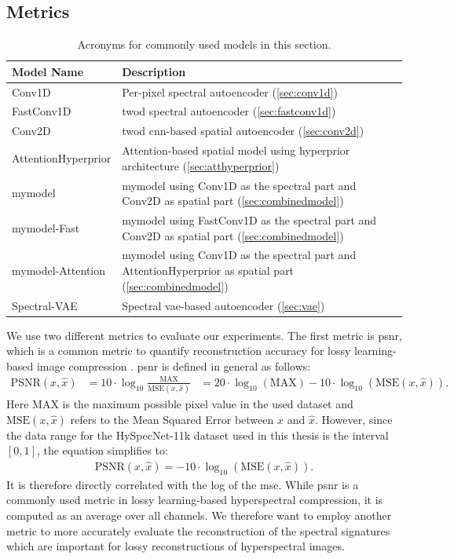 \subsection{Metrics}
\begin{table}
\centering
\caption[Acronyms for Commonly Used Models]{Acronyms for commonly used models in this section.}
\begin{tabularx}{\textwidth}{|L|L|}
\hline
Model Name & Description \\
\hline\hline
Conv1D & Per-pixel spectral autoencoder (\autoref{sec:conv1d})\\
\hline
FastConv1D & \Ac{twod} spectral autoencoder (\autoref{sec:fastconv1d})\\
\hline
Conv2D & \Ac{twod} \ac{cnn}-based spatial autoencoder (\autoref{sec:conv2d})\\
\hline
AttentionHyperprior & Attention-based spatial model using hyperprior architecture (\autoref{sec:atthyperprior}) \\
\hline
\ac{mymodel} & \ac{mymodel} using Conv1D as the spectral part and Conv2D as spatial part (\autoref{sec:combinedmodel}) \\
\hline
\ac{mymodel}-Fast & \ac{mymodel} using FastConv1D as the spectral part and Conv2D as spatial part (\autoref{sec:combinedmodel}) \\
\hline
\ac{mymodel}-Attention & \ac{mymodel} using Conv1D as the spectral part and AttentionHyperprior as spatial part (\autoref{sec:combinedmodel}) \\
\hline
Spectral-VAE & Spectral \ac{vae}-based autoencoder (\autoref{sec:vae}) \\
\hline
\end{tabularx}
\label{fig:shortnames}
\end{table}
We use two different metrics to evaluate our experiments. The first metric is \ac{psnr}, which is a common metric to quantify reconstruction accuracy for lossy learning-based image compression \citep{balle_end--end_2017,balle_variational_2018,minnen_joint_2018,kuester_1d-convolutional_2021,kuester_transferability_2022,la_grassa_hyperspectral_2022}. \Ac{psnr}  is defined in general as follows:
\begin{align}
\text{PSNR}(x,\hat{x}) &= 10\cdot \log_{10}\frac{\text{MAX}}{\text{MSE}(x,\hat{x})}
&= 20 \cdot \log_{10}(\text{MAX}) - 10\cdot \log_{10}(\text{MSE}(x,\hat{x})).
\end{align}
Here MAX is the maximum possible pixel value in the used dataset and $\text{MSE}(x,\hat{x})$ refers to the Mean Squared Error between $x$ and $\hat{x}$. However, since the data range for the HySpecNet-11k dataset used in this thesis is the interval $[0,1]$, the equation simplifies to:
\begin{align}
\text{PSNR}(x,\hat{x}) = - 10\cdot \log_{10}(\text{MSE}(x,\hat{x})).
\end{align}
It is therefore directly correlated with the log of the \ac{mse}.
While \ac{psnr} is a commonly used metric in lossy learning-based hyperspectral compression, it is computed as an average over all channels. We therefore want to employ another metric to more accurately evaluate the reconstruction of the spectral signatures which are important for lossy reconstructions of hyperspectral images.

